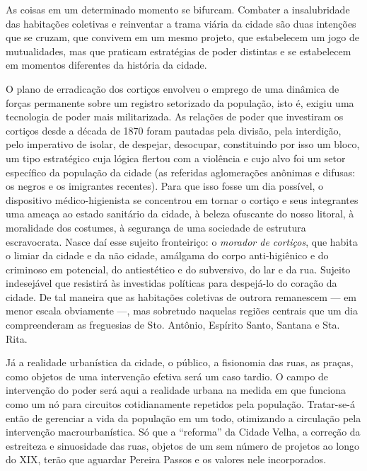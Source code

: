 As coisas em um determinado momento se bifurcam. Combater a
insalubridade das habitações coletivas e reinventar a trama viária da
cidade são duas intenções que se cruzam, que convivem em um mesmo
projeto, que estabelecem um jogo de mutualidades, mas que praticam
estratégias de poder distintas e se estabelecem em momentos diferentes
da história da cidade.

O plano de erradicação dos cortiços envolveu o emprego de uma dinâmica
de forças permanente sobre um registro setorizado da população, isto é,
exigiu uma tecnologia de poder mais militarizada. As relações de poder
que investiram os cortiços desde a década de 1870 foram pautadas pela
divisão, pela interdição, pelo imperativo de isolar, de despejar,
desocupar, constituindo por isso um bloco, um tipo estratégico cuja
lógica flertou com a violência e cujo alvo foi um setor específico da
população da cidade (as referidas aglomerações anônimas e difusas: os
negros e os imigrantes recentes). Para que isso fosse um dia possível, o
dispositivo médico-higienista se concentrou em tornar o cortiço e seus
integrantes uma ameaça ao estado sanitário da cidade, à beleza ofuscante
do nosso litoral, à moralidade dos costumes, à segurança de uma
sociedade de estrutura escravocrata. Nasce daí esse sujeito fronteiriço:
o \textit{morador de cortiços}, que habita o limiar da cidade e da não
cidade, amálgama do corpo anti-higiênico e do criminoso em potencial, do
antiestético e do subversivo, do lar e da rua. Sujeito indesejável que
resistirá às investidas políticas para despejá-lo do coração da cidade.
De tal maneira que as habitações coletivas de outrora remanescem --- em
menor escala obviamente ---, mas sobretudo naquelas regiões centrais que
um dia compreenderam as freguesias de Sto. Antônio, Espírito Santo,
Santana e Sta. Rita.

Já a realidade urbanística da cidade, o público, a fisionomia das ruas,
as praças, como objetos de uma intervenção efetiva será um caso tardio.
O campo de intervenção do poder será aqui a realidade urbana na medida
em que funciona como um nó para circuitos cotidianamente repetidos pela
população. Tratar-se-á então de gerenciar a vida da população em um
todo, otimizando a circulação pela intervenção macrourbanística. Só que
a ``reforma'' da Cidade Velha, a correção da estreiteza e sinuosidade
das ruas, objetos de um sem número de projetos ao longo do XIX, terão
que aguardar Pereira Passos e os valores nele incorporados.

